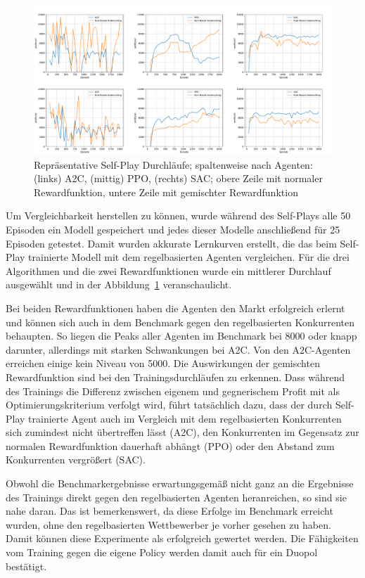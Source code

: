 \begin{figure}[htb]
	\centering
	\includegraphics[width=\textwidth]{main/self_play_detailed.pdf}
	\caption{Repräsentative Self-Play Durchläufe; spaltenweise nach Agenten: (links) A2C, (mittig) PPO, (rechts) SAC; obere Zeile mit normaler Rewardfunktion, untere Zeile mit gemischter Rewardfunktion}
	\label{graphic:SelfPlayDetails}
\end{figure}
Um Vergleichbarkeit herstellen zu können, wurde während des Self-Plays alle 50 Episoden ein Modell gespeichert und jedes dieser Modelle anschließend für 25 Episoden getestet.
Damit wurden akkurate Lernkurven erstellt, die das beim Self-Play trainierte Modell mit dem regelbasierten Agenten vergleichen.
Für die drei Algorithmen und die zwei Rewardfunktionen wurde ein mittlerer Durchlauf ausgewählt und in der \mbox{Abbildung \ref{graphic:SelfPlayDetails}} veranschaulicht.

Bei beiden Rewardfunktionen haben die Agenten den Markt erfolgreich erlernt und können sich auch in dem Benchmark gegen den regelbasierten Konkurrenten behaupten.
So liegen die Peaks aller Agenten im Benchmark bei 8000 oder knapp darunter, allerdings mit starken Schwankungen bei A2C.
Von den A2C-Agenten erreichen einige kein Niveau von 5000.
Die Auswirkungen der gemischten Rewardfunktion sind bei den Trainingsdurchläufen zu erkennen.
Dass während des Trainings die Differenz zwischen eigenem und gegnerischem Profit mit als Optimierungskriterium verfolgt wird, führt tatsächlich dazu, dass der durch Self-Play trainierte Agent auch im Vergleich mit dem regelbasierten Konkurrenten sich zumindest nicht übertreffen lässt (A2C), den Konkurrenten im Gegensatz zur normalen Rewardfunktion dauerhaft abhängt (PPO) oder den Abstand zum Konkurrenten vergrößert (SAC).

Obwohl die Benchmarkergebnisse erwartungsgemäß nicht ganz an die Ergebnisse des Trainings direkt gegen den regelbasierten Agenten heranreichen, so sind sie nahe daran.
Das ist bemerkenswert, da diese Erfolge im Benchmark erreicht wurden, ohne den regelbasierten Wettbewerber je vorher gesehen zu haben.
Damit können diese Experimente als erfolgreich gewertet werden.
Die Fähigkeiten vom Training gegen die eigene Policy werden damit auch für ein Duopol bestätigt.

